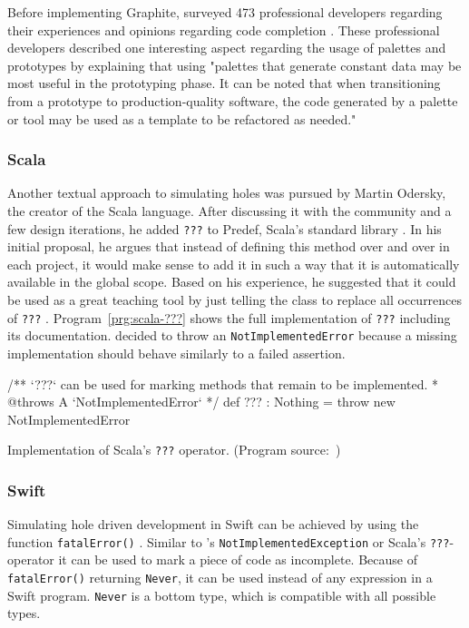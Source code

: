 Before implementing Graphite, \citeauthor{omar_active_2012} surveyed 473 professional developers regarding their experiences and opinions regarding code completion \cite{omar_active_2012}.
These professional developers described one interesting aspect regarding the usage of palettes and prototypes by explaining that using "palettes that generate constant data may be most useful in the prototyping phase. It can be noted that when transitioning from a prototype to production-quality software, the code generated by a palette or tool may be used as a template to be refactored as needed." \cite{omar_active_2012}

\subsubsection{Scala}
Another textual approach to simulating holes was pursued by Martin Odersky, the creator of the Scala language.
After discussing it with the community and a few design iterations, he added \texttt{???} to Predef, Scala's standard library \cite{odersky_adding_2011}.
In his initial proposal, he argues that instead of defining this method over and over in each project, it would make sense to add it in such a way that it is automatically available in the global scope.
Based on his experience, he suggested that it could be used as a great teaching tool by just telling the class to replace all occurrences of \texttt{???} \cite{odersky_adding_2011}.
Program~\ref{prg:scala-???} shows the full implementation of \texttt{???} including its documentation.
\citeauthor{odersky_adding_2011} decided to throw an \texttt{NotImplementedError} because a missing implementation should behave similarly to a failed assertion.
%
\begin{program}[ht]
\begin{GenericCode}
/** `???` can be used for marking methods that remain to be implemented.
* @throws A `NotImplementedError`
*/
def ??? : Nothing = throw new NotImplementedError
\end{GenericCode}
\caption{Implementation of Scala's \texttt{???} operator. (Program source:~\cite{odersky_adding_2011})}
\label{prg:scala-???}
\end{program}

\subsubsection{Swift}
Simulating hole driven development in Swift can be achieved by using the function \texttt{fatalError()} \cite{martinez_hole_2018}.
Similar to \CS's \texttt{NotImplementedException} or Scala's \texttt{???}-operator it can be used to mark a piece of code as incomplete.
Because of \texttt{fatalError()} returning \texttt{Never}, it can be used instead of any expression in a Swift program.
\texttt{Never} is a bottom type, which is compatible with all possible types.

